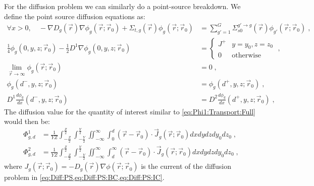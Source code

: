 \documentclass[a4paper,letterpaper,12pt,oneside,draft]{article}
\newcommand{\eec}{\;,}
\newcommand{\vr}{\ensuremath{\vec{r}}}
\newcommand{\dvr}{\left(\vr-\vr_0\right)}
\begin{document}
    For the diffusion problem we can similarly do a point-source breakdown. We define the point source diffusion equations as:
    \begin{align}
    \label{eq:Diff:PS}
    \forall x>0, \quad-\nabla D_g(\vr)\nabla\phi_g(\vr;\vr_0) + \Sigma_{t,g}(\vr)\phi_g(\vr;\vr_0) &= \sum_{g'=1}^G\Sigma_{s0}^{g'\to g}(\vr)\phi_{g'}(\vr;\vr_0) \eec\\
    \label{eq:Diff:PS:BC}
    \frac{1}{4}\phi_g(0,y,z;\vr_0) - \frac{1}{2}D^1\nabla\phi_g(0,y,z;\vr_0) &= \begin{cases}
    J^+ & y=y_0, z=z_0 \\
    0 & \text{otherwise}
    \end{cases} \eec\\\nonumber
    \lim\limits_{\vr\to\infty}\phi_g(\vr;\vr_0) &= 0 \eec\\
    \label{eq:Diff:PS:IC}
    \phi_g(d^-,y,z;\vr_0) &= \phi_g(d^+,y,z;\vr_0) \eec\\
    \nonumber
    D^1\frac{d\phi_g}{dx}(d^-,y,z;\vr_0) &= D^2\frac{d\phi_g}{dx}(d^+,y,z;\vr_0)\eec
    \end{align}
    The diffusion value for the quantity of interest similar to \cref{eq:Phi1:Transport:Full} would then be:
    \begin{align}
        \label{eq:Phi1:Diffusion}
        \Phi_{g,d}^1 &= \frac{1}{YZ} \int_{-\frac{Z}{2}}^{\frac{Z}{2}} \int_{-\frac{Y}{2}}^{\frac{Y}{2}} \iint_{-\infty}^{\infty} \int_{0}^{d} \dvr\cdot \vec{J}_g(\vr;\vr_0)dxdydzdy_0dz_0 \eec \\\nonumber
        \Phi_{g,d}^2 &= \frac{1}{YZ} \int_{-\frac{Z}{2}}^{\frac{Z}{2}} \int_{-\frac{Y}{2}}^{\frac{Y}{2}} \iint_{-\infty}^{\infty} \int_{d}^{\infty} \dvr\cdot \vec{J}_g(\vr;\vr_0)dxdydzdy_0dz_0 \eec
    \end{align}
    where $J_g(\vr;\vr_0)=-D_g(\vr)\nabla\phi(\vr;\vr_0)$ is the current of the diffusion problem in \cref{eq:Diff:PS,eq:Diff:PS:BC,eq:Diff:PS:IC}. 
    
\end{document}
